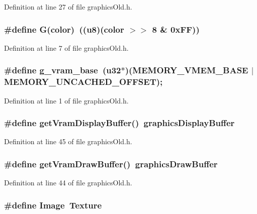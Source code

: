 Definition at line 27 of file graphics\-Old.h.
\subsubsection{\setlength{\rightskip}{0pt plus 5cm}\#define G(color)~((u8)(color $>$$>$ 8 \& 0x\-FF))}\label{graphicsOld_8h_7721ca941dbab8a1a0704d4bd60e513f}




Definition at line 7 of file graphics\-Old.h.
\subsubsection{\setlength{\rightskip}{0pt plus 5cm}\#define g\_\-vram\_\-base~(u32$\ast$)(MEMORY\_\-VMEM\_\-BASE $|$ MEMORY\_\-UNCACHED\_\-OFFSET);}\label{graphicsOld_8h_eb021147427f5005732a89d0034a8647}




Definition at line 1 of file graphics\-Old.h.
\subsubsection{\setlength{\rightskip}{0pt plus 5cm}\#define get\-Vram\-Display\-Buffer()~graphics\-Display\-Buffer}\label{graphicsOld_8h_d08befdec35ad8e2a5b5eb0803ef78db}




Definition at line 45 of file graphics\-Old.h.
\subsubsection{\setlength{\rightskip}{0pt plus 5cm}\#define get\-Vram\-Draw\-Buffer()~{\bf graphics\-Draw\-Buffer}}\label{graphicsOld_8h_3cccae3a5f088e1e88613e8d307969e5}




Definition at line 44 of file graphics\-Old.h.
\subsubsection{\setlength{\rightskip}{0pt plus 5cm}\#define Image~{\bf Texture}}\label{graphicsOld_8h_00e10f90bb04c63972b0729024b0883b}




